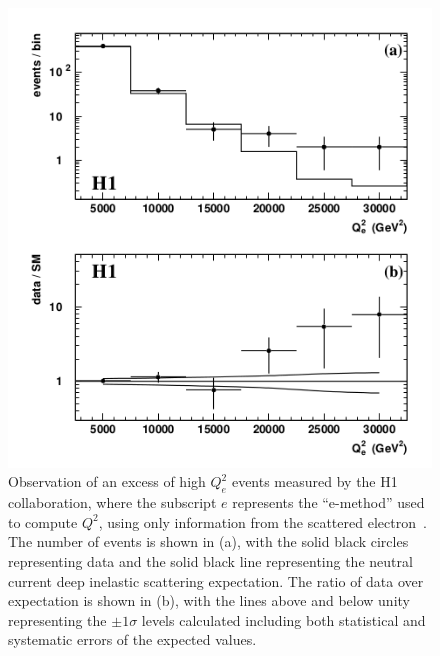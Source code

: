 \begin{figure}[!Hh]
       \centering
       \includegraphics[scale=0.65]{Figures/H1Excess_Q2.png} 
       \caption[Excesses measured by the H1 collaboration in the $Q^2$ distribution of neutral current deep inelastic scattering events]{Observation of an excess of high $Q_e^2$ events measured by the H1 collaboration, where the subscript $e$ represents the ``e-method'' used to compute $Q^2$, using only information from the scattered electron~\cite{H1excess}.  The number of events is shown in (a), with the solid black circles representing data and the solid black line representing the neutral current deep inelastic scattering expectation.  The ratio of data over expectation is shown in (b), with the lines above and below unity representing the $\pm1\sigma$ levels calculated including both statistical and systematic errors of the expected values.}
\label{figapp:Q2excess}
\end{figure}


